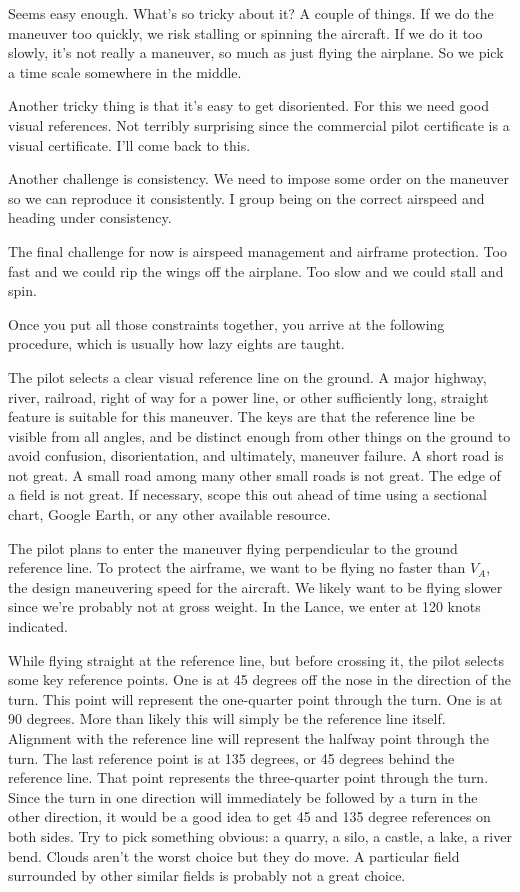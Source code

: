 Seems easy enough. What's so tricky about it? A couple of things. If we do the maneuver too quickly, we risk stalling or spinning the aircraft. If we do it too slowly, it's not really a maneuver, so much as just flying the airplane. So we pick a time scale somewhere in the middle.

Another tricky thing is that it's easy to get disoriented. For this we need good visual references. Not terribly surprising since the commercial pilot certificate is a visual certificate. I'll come back to this.

Another challenge is consistency. We need to impose some order on the maneuver so we can reproduce it consistently. I group being on the correct airspeed and heading under consistency.

The final challenge for now is airspeed management and airframe protection. Too fast and we could rip the wings off the airplane. Too slow and we could stall and spin.

Once you put all those constraints together, you arrive at the following procedure, which is usually how lazy eights are taught.

The pilot selects a clear visual reference line on the ground. A major highway, river, railroad, right of way for a power line, or other sufficiently long, straight feature is suitable for this maneuver. The keys are that the reference line be visible from all angles, and be distinct enough from other things on the ground to avoid confusion, disorientation, and ultimately, maneuver failure. A short road is not great. A small road among many other small roads is not great. The edge of a field is not great. If necessary, scope this out ahead of time using a sectional chart, Google Earth, or any other available resource.

The pilot plans to enter the maneuver flying perpendicular to the ground reference line. To protect the airframe, we want to be flying no faster than $V_A$, the design maneuvering speed for the aircraft. We likely want to be flying slower since we're probably not at gross weight. In the Lance, we enter at 120 knots indicated.

While flying straight at the reference line, but before crossing it, the pilot selects some key reference points. One is at 45 degrees off the nose in the direction of the turn. This point will represent the one-quarter point through the turn. One is at 90 degrees. More than likely this will simply be the reference line itself. Alignment with the reference line will represent the halfway point through the turn. The last reference point is at 135 degrees, or 45 degrees behind the reference line. That point represents the three-quarter point through the turn. Since the turn in one direction will immediately be followed by a turn in the other direction, it would be a good idea to get 45 and 135 degree references on both sides. Try to pick something obvious: a quarry, a silo, a castle, a lake, a river bend. Clouds aren't the worst choice but they do move. A particular field surrounded by other similar fields is probably not a great choice.

